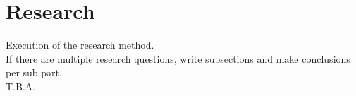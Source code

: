 \documentclass[../main.tex]{subfiles}
\begin{document}
    \section{Research}\label{sec:research}
    Execution of the research method. 
    \\
    If there are multiple research questions, write subsections and make conclusions per sub part.
    \\
    T.B.A. %
\end{document}
